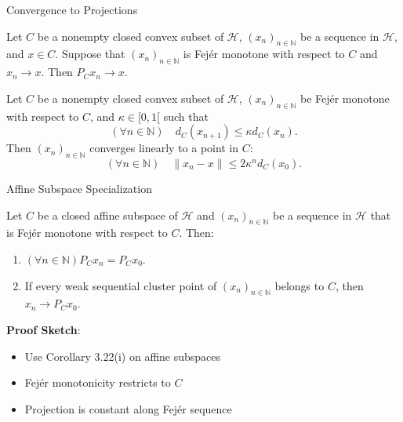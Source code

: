 \documentclass[aspectratio=169,10pt]{beamer}
\begin{document}
\begin{frame}{Convergence to Projections}
    \begin{corollary}[Corollary 5.8]
        Let $C$ be a nonempty closed convex subset of $\mathcal{H}$, $(x_n)_{n \in \mathbb{N}}$ be a sequence in $\mathcal{H}$, and $x \in C$. Suppose that $(x_n)_{n \in \mathbb{N}}$ is Fejér monotone with respect to $C$ and $x_n \to x$.
        Then $P_C x_n \to x$.
    \end{corollary}

    \vspace{0.3cm}

    \begin{theorem}
        Let $C$ be a nonempty closed convex subset of $\mathcal{H}$, $(x_n)_{n \in \mathbb{N}}$ be Fejér monotone with respect to $C$, and $\kappa \in [0, 1[$ such that
        \[
            (\forall n \in \mathbb{N}) \quad d_C(x_{n+1}) \leq \kappa d_C(x_n).
        \]
        Then $(x_n)_{n \in \mathbb{N}}$ converges linearly to a point in $C$:
        \[
            (\forall n \in \mathbb{N}) \quad \|x_n - x\| \leq 2\kappa^n d_C(x_0).
        \]
    \end{theorem}
\end{frame}

\begin{frame}{Affine Subspace Specialization}
    \begin{theorem}[Proposition 5.9]
        Let $C$ be a closed affine subspace of $\mathcal{H}$ and $(x_n)_{n \in \mathbb{N}}$ be a sequence in $\mathcal{H}$ that is Fejér monotone with respect to $C$.
        Then:
        \begin{enumerate}
            \item $(\forall n \in \mathbb{N}) P_C x_n = P_C x_0$.
            \item If every weak sequential cluster point of $(x_n)_{n \in \mathbb{N}}$ belongs to $C$, then $x_n \to P_C x_0$.
        \end{enumerate}
    \end{theorem}

    \vspace{0.3cm}

    \textbf{Proof Sketch}:
    \begin{itemize}
        \item Use Corollary 3.22(i) on affine subspaces
        \item Fejér monotonicity restricts to $C$
        \item Projection is constant along Fejér sequence
    \end{itemize}
\end{frame}
\end{document}
